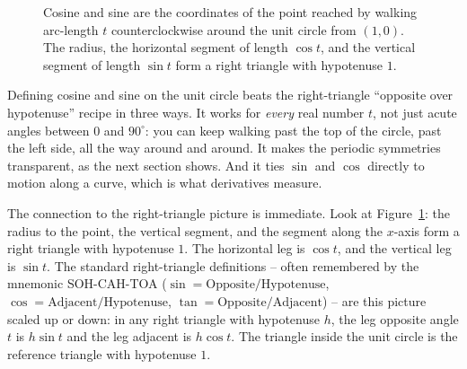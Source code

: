 \begin{figure}[htbp]
\centering
{}
\caption{Cosine and sine are the coordinates of the point reached by walking arc-length $t$ counterclockwise around the unit circle from $(1,0)$. The radius, the horizontal segment of length $\cos t$, and the vertical segment of length $\sin t$ form a right triangle with hypotenuse $1$.}
\label{ch04:fig-unitcircle}
\end{figure}

Defining cosine and sine on the unit circle beats the right-triangle ``opposite over hypotenuse'' recipe in three ways. It works for \emph{every} real number $t$, not just acute angles between $0$ and $90^\circ$: you can keep walking past the top of the circle, past the left side, all the way around and around. It makes the periodic symmetries transparent, as the next section shows. And it ties $\sin$ and $\cos$ directly to motion along a curve, which is what derivatives measure.

The connection to the right-triangle picture is immediate. Look at Figure~\ref{ch04:fig-unitcircle}: the radius to the point, the vertical segment, and the segment along the $x$-axis form a right triangle with hypotenuse $1$. The horizontal leg is $\cos t$, and the vertical leg is $\sin t$. The standard right-triangle definitions -- often remembered by the mnemonic SOH-CAH-TOA ($\sin = \text{Opposite}/\text{Hypotenuse}$, $\cos = \text{Adjacent}/\text{Hypotenuse}$, $\tan = \text{Opposite}/\text{Adjacent}$) -- are this picture scaled up or down: in any right triangle with hypotenuse $h$, the leg opposite angle $t$ is $h\sin t$ and the leg adjacent is $h\cos t$. The triangle inside the unit circle is the reference triangle with hypotenuse $1$.

